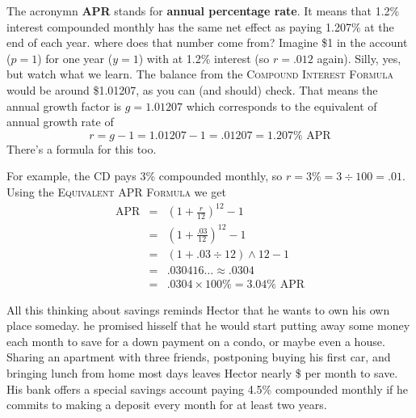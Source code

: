 The acronymn \textbf{APR} stands for \textbf{annual percentage rate}.  It means that 1.2\% interest compounded monthly has the same net effect as paying 1.207\% at the end of each year.  where does that number come from?  Imagine \$1 in the account  ($p=1$) for one year ($y=1$) with at 1.2\% interest (so $r=.012$ again).  Silly, yes, but watch what we learn.  
The balance from the \textsc{Compound Interest Formula} would be around \$1.01207, as you can (and should) check.
That means the annual growth factor is $g=1.01207$ which corresponds to the equivalent of annual growth rate of $$r=g-1=1.01207-1 = .01207 = 1.207\% \text{ APR}$$  There's a formula for this too.

 \bigskip
\bigskip

For example, the CD pays 3\% compounded monthly, so $r=3\% = 3 \div 100 = .01$.  Using the \textsc{Equivalent APR Formula} we get
\begin{eqnarray*}
\text{APR}  &= & \left(1+\frac{r}{12}\right)^{12}-1\\
& = &   \left(1+\frac{.03}{12}\right)^{12}-1\\
& =  & ( 1 + .03 \div 12 ) \wedge 12 -1  \\
& =  & .030416\ldots  \approx .0304 \\
& = & .0304 \times 100\% = 3.04\% \text{ APR}
\end{eqnarray*}

All this thinking about savings reminds Hector that he wants to own his own place someday.  he promised hisself that he would start putting away some money each month to save for a down payment on a condo, or maybe even a house.  Sharing an apartment with three friends, postponing buying his first car, and bringing lunch from home most days leaves Hector nearly \$ per month to save.  His bank offers a special savings account paying 4.5\% compounded monthly if he commits to making a deposit every month for at least two years.

